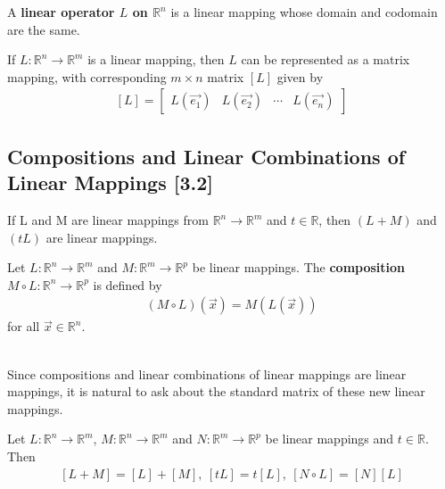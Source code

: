 \documentclass[a4paper,9pt]{extarticle}
\begin{document}
\begin{multicols*}{2}
A \textbf{linear operator $L$ on $\mathbb{R}^n$} is a linear mapping whose domain and codomain are the same.

If $L: \mathbb{R}^n \to \mathbb{R}^m$ is a linear mapping, then $L$ can be represented as a matrix mapping, with corresponding $m \times n$ matrix $[L]$ given by
\begin{equation} \label{3.2-2}
    \begin{split}
        [L] = \begin{bmatrix}L(\vec{e_1}) & L(\vec{e_2}) & \cdots & L(\vec{e_n}) \end{bmatrix}
    \end{split}
\end{equation}


\subsection{Compositions and Linear Combinations
of Linear Mappings [3.2]}
If L and M are linear mappings from $\mathbb{R}^n \to \mathbb{R}^m$ and $t \in \mathbb{R}$, then $(L + M)$ and $(t L)$ are linear mappings.

Let $L: \mathbb{R}^n \to \mathbb{R}^m$ and $M: \mathbb{R}^m \to \mathbb{R}^p$ be linear mappings. The \textbf{composition} $M \circ L: \mathbb{R}^n \to \mathbb{R}^p$ is defined by 
\begin{equation} \label{3.2-3}
    \begin{split}
        (M \circ L)(\vec{x}) = M(L(\vec{x}))
    \end{split}
\end{equation}
for all $\vec{x} \in \mathbb{R}^n$.

\noindent \\ Since compositions and linear combinations of linear mappings are linear mappings, it is natural to ask about the standard matrix of these new linear mappings.

Let $L: \mathbb{R}^n \to \mathbb{R}^m$, $M: \mathbb{R}^n \to \mathbb{R}^m$ and $N: \mathbb{R}^m \to \mathbb{R}^p$ be linear mappings and $t \in \mathbb{R}$. Then
\begin{equation} \label{3.2-4}
    \begin{split}
        [L + M] = [L] + [M], \> [t L] = t[L], \> [N \circ L] = [N][L]
    \end{split}
\end{equation}



\end{multicols*}
\end{document}
